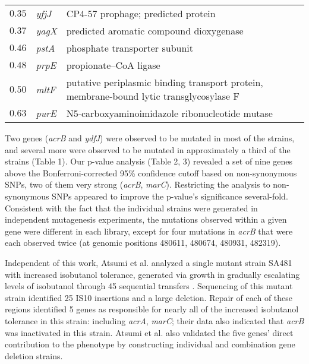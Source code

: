\documentclass[letterpaper,10pt,english]{howto}
\begin{document}
\begin{threeparttable}
\begin{tabulary}{\textwidth}{|L|L|L|}
$0.35$
 & 
\emph{yfjJ}
 & 
CP4-57 prophage; predicted protein
\\

$0.37$
 & 
\emph{yagX}
 & 
predicted aromatic compound dioxygenase
\\

$0.46$
 & 
\emph{pstA}
 & 
phosphate transporter subunit
\\

$0.48$
 & 
\emph{prpE}
 & 
propionate--CoA ligase
\\

$0.50$
 & 
\emph{mltF}
 & 
putative periplasmic binding transport protein,
membrane-bound lytic transglycosylase F
\\

$0.63$
 & 
\emph{purE}
 & 
N5-carboxyaminoimidazole ribonucleotide mutase
\\
\hline
\end{tabulary}

\end{threeparttable}


Two genes (\emph{acrB} and \emph{ydfJ}) were observed to be mutated in most
of the strains, and several more were observed to be mutated in
approximately a third of the strains (Table 1).  Our p-value analysis
(Table 2, 3) revealed a set of nine genes above the Bonferroni-corrected
95\% confidence cutoff based on non-synonymous SNPs,
two of them very strong (\emph{acrB}, \emph{marC}).
Restricting the analysis to non-synonymous SNPs
appeared to improve the p-value's significance several-fold.
Consistent with the fact that the individual strains were
generated in independent mutagenesis experiments, the mutations
observed within a given gene were different in each library,
except for four mutations in \emph{acrB} that were each observed twice
(at genomic positions 480611, 480674, 480931, 482319).

Independent of this work, Atsumi et al. analyzed a single mutant
strain SA481 with increased isobutanol tolerance, generated via
growth in gradually escalating levels of isobutanol through
45 sequential transfers \cite{Atsumi2011} .  Sequencing of this mutant
strain identified 25 IS10 insertions and a large deletion.  Repair
of each of these regions identified 5 genes as responsible for
nearly all of the increased isobutanol tolerance in this strain:
including \emph{acrA}, \emph{marC}; their data also indicated that \emph{acrB} was
inactivated in this strain.  Atsumi et al. also validated
the five genes' direct contribution to the phenotype by constructing
individual and combination gene deletion strains.
\end{document}
